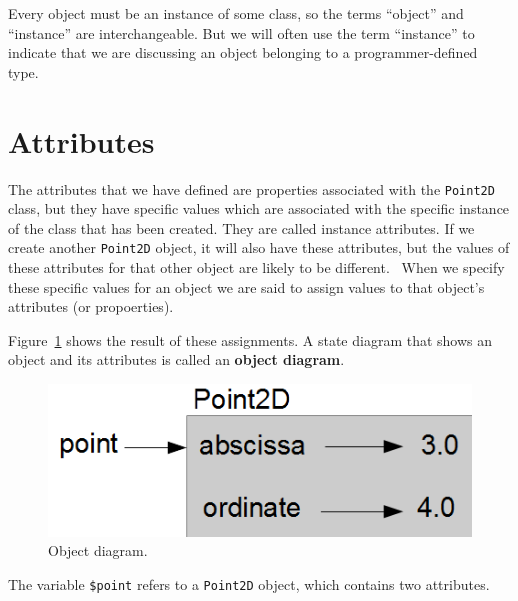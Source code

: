 Every object must be an instance of some class, so the terms 
``object'' and ``instance'' are interchangeable.  But 
we will often use the term ``instance'' to indicate that we are 
discussing an object belonging to a programmer-defined type.

\section{Attributes}
\label{attributes}

The attributes that we have defined are properties associated 
with the {\tt Point2D} class, but they have specific values which are
associated with the specific instance of the class that has been created. 
They are called instance attributes. If we create another {\tt Point2D} object, 
it will also have these attributes, but the values of 
these attributes for that other object are likely to be different. \
When we specify these specific values for an object we are said to assign
values to that object's attributes (or propoerties).

Figure~\ref{fig.point2d} shows the result of these assignments.
A state diagram that shows an object and its attributes is
called an {\bf object diagram}.

\begin{figure}
\centerline
{\includegraphics[scale=0.8]{figs/point2D.png}}
\caption{Object diagram.}
\label{fig.point2d}
\end{figure}

The variable {\tt \$point} refers to a {\tt Point2D} object, 
which contains two attributes.  

